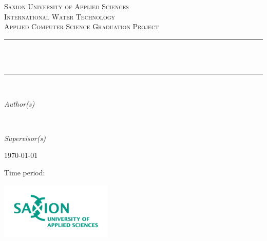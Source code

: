 \begin{titlepage}
  	\newcommand{\HRule}{\rule{\linewidth}{0.3mm}}
	\center
	\textsc{\LARGE Saxion University of Applied Sciences}\\[1.5cm]
	\textsc{\Large International Water Technology}\\[0.5cm]
	\textsc{\large Applied Computer Science Graduation Project}\\[0.5cm]
	\HRule\\[0.4cm]
	{\huge\bfseries \@title}\\[0.4cm]
	\HRule\\[1.5cm]

	\begin{minipage}{0.4\textwidth}
		\begin{flushleft}
			\large
			\textit{Author(s)}\\
			\@author %
		\end{flushleft}
	\end{minipage}
	~
	\begin{minipage}{0.4\textwidth}
		\begin{flushright}
			\large
			\textit{Supervisor(s)}\\
			\supervisors
		\end{flushright}
	\end{minipage}
	

	\vfill\vfill
		{\large\today}
    \vfill\vfill
    
    \footnotesize{Time period: \timePeriod}
    \\[0.3cm]
    \vfill
    \homepage
    
    \vfill
    
    
	
	\vfill\vfill
	\includegraphics[width=0.4\textwidth]{./saxionlogo.png}
	\vfill
	 
	\vfill
	
\end{titlepage}
